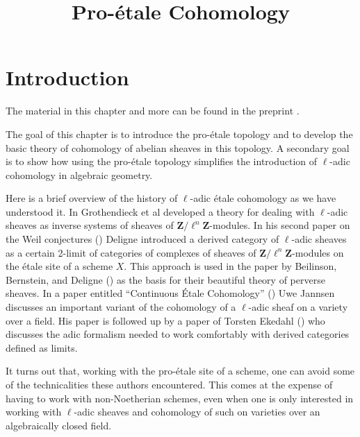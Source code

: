 \documentclass{stacks-project}
\theoremstyle{plain}
\theoremstyle{definition}
\theoremstyle{remark}
\numberwithin{equation}{subsection}
\begin{document}
\title{Pro-\'etale Cohomology}


\maketitle

\label{section-phantom}

\tableofcontents

\section{Introduction}
\label{section-introduction}

\noindent
The material in this chapter and more can be found in the preprint \cite{BS}.

\medskip\noindent
The goal of this chapter is to introduce the pro-\'etale topology and to
develop the basic theory of cohomology of abelian sheaves in this topology.
A secondary goal is to show how using the pro-\'etale topology simplifies
the introduction of $\ell$-adic cohomology in algebraic geometry.

\medskip\noindent
Here is a brief overview of the history of $\ell$-adic \'etale cohomology
as we have understood it.
In \cite[Expos\'es V and VI]{SGA5} Grothendieck et al developed a theory for
dealing with $\ell$-adic sheaves as inverse systems of sheaves of
$\mathbf{Z}/\ell^n\mathbf{Z}$-modules.
In his second paper on the Weil conjectures (\cite{WeilII}) Deligne introduced
a derived category of $\ell$-adic sheaves as a certain 2-limit of categories
of complexes of sheaves of $\mathbf{Z}/\ell^n\mathbf{Z}$-modules on the
\'etale site of a scheme $X$. This approach is used in the paper by
Beilinson, Bernstein, and Deligne (\cite{BBD}) as the basis for their
beautiful theory of perverse sheaves. In a paper entitled ``Continuous
\'Etale Cohomology'' (\cite{Jannsen}) Uwe Jannsen discusses an important
variant of the cohomology of a $\ell$-adic sheaf on a variety over a field.
His paper is followed up by a paper of Torsten Ekedahl (\cite{Ekedahl})
who discusses the adic formalism needed to work comfortably with derived
categories defined as limits.

\medskip\noindent
It turns out that, working with the pro-\'etale site of a scheme,
one can avoid some of the technicalities these authors encountered.
This comes at the expense of having to work with non-Noetherian schemes,
even when one is only interested in working with $\ell$-adic sheaves
and cohomology of such on varieties over an algebraically closed field.
\end{document}
